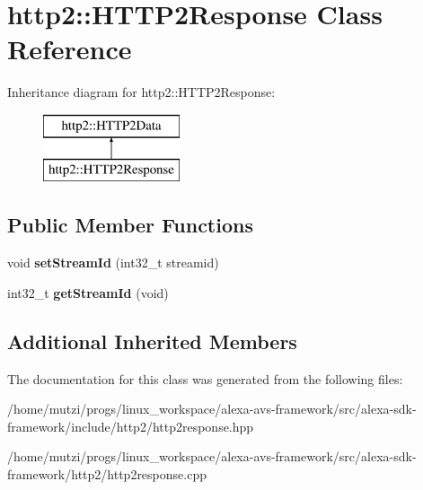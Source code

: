 \hypertarget{classhttp2_1_1HTTP2Response}{}\section{http2\+:\+:H\+T\+T\+P2\+Response Class Reference}
\label{classhttp2_1_1HTTP2Response}
Inheritance diagram for http2\+:\+:H\+T\+T\+P2\+Response\+:\begin{figure}[H]
\begin{center}
\leavevmode
\includegraphics[height=2.000000cm]{d5/da8/classhttp2_1_1HTTP2Response}
\end{center}
\end{figure}
\subsection*{Public Member Functions}
\begin{DoxyCompactItemize}
\item 
\mbox{\label{classhttp2_1_1HTTP2Response_a43a53e1a5f9d410989d71a5f2d63c0f0}} 
void {\bfseries set\+Stream\+Id} (int32\+\_\+t streamid)
\item 
\mbox{\label{classhttp2_1_1HTTP2Response_a94e9aff14c1df3e5109990ed2b3ed848}} 
int32\+\_\+t {\bfseries get\+Stream\+Id} (void)
\end{DoxyCompactItemize}
\subsection*{Additional Inherited Members}


The documentation for this class was generated from the following files\+:\begin{DoxyCompactItemize}
\item 
/home/mutzi/progs/linux\+\_\+workspace/alexa-\/avs-\/framework/src/alexa-\/sdk-\/framework/include/http2/http2response.\+hpp\item 
/home/mutzi/progs/linux\+\_\+workspace/alexa-\/avs-\/framework/src/alexa-\/sdk-\/framework/http2/http2response.\+cpp\end{DoxyCompactItemize}
